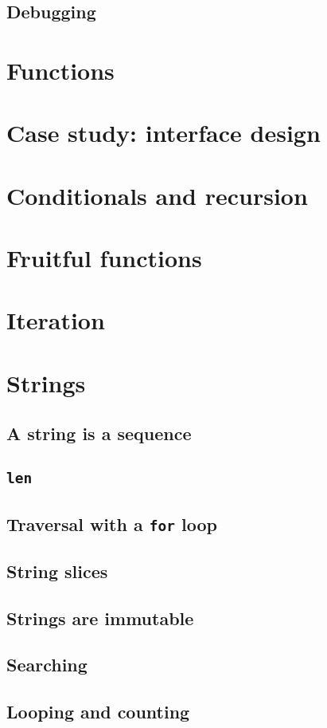 \documentclass{article}
\begin{document}
\subsection{Debugging}


\section{Functions}
\section{Case study: interface design}
\section{Conditionals and recursion}
\section{Fruitful functions}
\section{Iteration}
\newpage%
\section{Strings}
\subsection{A string is a sequence}
\subsection{\texttt{len}}
\subsection{Traversal with a \texttt{for} loop}
\subsection{String slices}
\subsection{Strings are immutable}
\subsection{Searching}
\subsection{Looping and counting}
\end{document}

